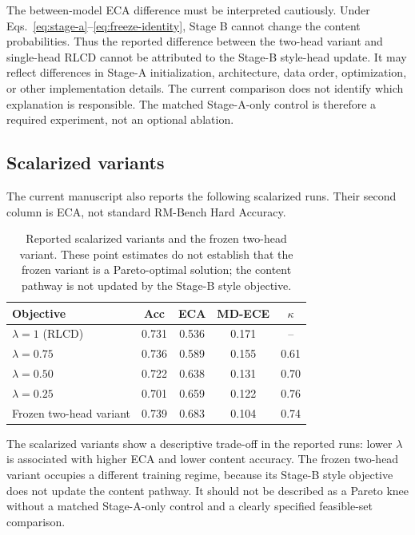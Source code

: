 \documentclass[letterpaper]{article} %
\begin{document}
The between-model ECA difference must be interpreted cautiously. Under Eqs.~\ref{eq:stage-a}--\ref{eq:freeze-identity}, Stage B cannot change the content probabilities. Thus the reported difference between the two-head variant and single-head RLCD cannot be attributed to the Stage-B style-head update. It may reflect differences in Stage-A initialization, architecture, data order, optimization, or other implementation details. The current comparison does not identify which explanation is responsible. The matched Stage-A-only control is therefore a required experiment, not an optional ablation.

\subsection{Scalarized variants}

The current manuscript also reports the following scalarized runs. Their second column is ECA, not standard RM-Bench Hard Accuracy.

\begin{table}[t]
\centering
\small
\setlength{\tabcolsep}{3.5pt}
\begin{tabular}{lcccc}
\toprule
Objective & Acc & ECA & MD-ECE & $\kappa$ \\
\midrule
$\lambda=1$ (RLCD) & 0.731 & 0.536 & 0.171 & -- \\
$\lambda=0.75$ & 0.736 & 0.589 & 0.155 & 0.61 \\
$\lambda=0.50$ & 0.722 & 0.638 & 0.131 & 0.70 \\
$\lambda=0.25$ & 0.701 & 0.659 & 0.122 & 0.76 \\
Frozen two-head variant & 0.739 & 0.683 & 0.104 & 0.74 \\
\bottomrule
\end{tabular}
\caption{Reported scalarized variants and the frozen two-head variant. These point estimates do not establish that the frozen variant is a Pareto-optimal solution; the content pathway is not updated by the Stage-B style objective.}
\label{tab:scalar}
\end{table}

The scalarized variants show a descriptive trade-off in the reported runs: lower $\lambda$ is associated with higher ECA and lower content accuracy. The frozen two-head variant occupies a different training regime, because its Stage-B style objective does not update the content pathway. It should not be described as a Pareto knee without a matched Stage-A-only control and a clearly specified feasible-set comparison.
\end{document}
